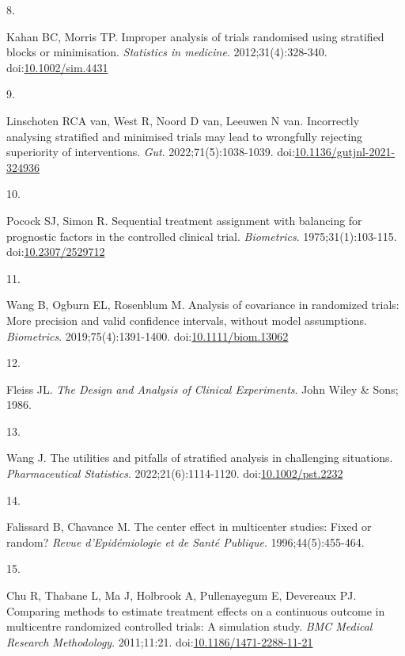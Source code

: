 \documentclass[
  11pt,
]{article}
\newlength{\cslhangindent}
\newlength{\csllabelwidth}
\newenvironment{CSLReferences}[2] %
 {\begin{list}{}{%
  \setlength{\itemindent}{0pt}
  \setlength{\leftmargin}{0pt}
  \setlength{\parsep}{0pt}
  \ifodd #1
   \setlength{\leftmargin}{\cslhangindent}
   \setlength{\itemindent}{-1\cslhangindent}
  \fi
  \setlength{\itemsep}{#2\baselineskip}}}
 {\end{list}}
\newcommand{\CSLLeftMargin}[1]{\parbox[t]{\csllabelwidth}{\strut#1\strut}}
\newcommand{\CSLRightInline}[1]{\parbox[t]{\linewidth - \csllabelwidth}{\strut#1\strut}}
\begin{document}
\begin{CSLReferences}{0}{1}
\CSLLeftMargin{8. }%
\CSLRightInline{Kahan BC, Morris TP. Improper analysis of trials randomised using stratified blocks or minimisation. \emph{Statistics in medicine}. 2012;31(4):328-340. doi:\href{https://doi.org/10.1002/sim.4431}{10.1002/sim.4431}}

\CSLLeftMargin{9. }%
\CSLRightInline{Linschoten RCA van, West R, Noord D van, Leeuwen N van. Incorrectly analysing stratified and minimised trials may lead to wrongfully rejecting superiority of interventions. \emph{Gut}. 2022;71(5):1038-1039. doi:\href{https://doi.org/10.1136/gutjnl-2021-324936}{10.1136/gutjnl-2021-324936}}

\CSLLeftMargin{10. }%
\CSLRightInline{Pocock SJ, Simon R. Sequential treatment assignment with balancing for prognostic factors in the controlled clinical trial. \emph{Biometrics}. 1975;31(1):103-115. doi:\href{https://doi.org/10.2307/2529712}{10.2307/2529712}}

\CSLLeftMargin{11. }%
\CSLRightInline{Wang B, Ogburn EL, Rosenblum M. Analysis of covariance in randomized trials: {More} precision and valid confidence intervals, without model assumptions. \emph{Biometrics}. 2019;75(4):1391-1400. doi:\href{https://doi.org/10.1111/biom.13062}{10.1111/biom.13062}}

\CSLLeftMargin{12. }%
\CSLRightInline{Fleiss JL. \emph{The Design and Analysis of Clinical Experiments}. John Wiley \& Sons; 1986.}

\CSLLeftMargin{13. }%
\CSLRightInline{Wang J. The utilities and pitfalls of stratified analysis in challenging situations. \emph{Pharmaceutical Statistics}. 2022;21(6):1114-1120. doi:\href{https://doi.org/10.1002/pst.2232}{10.1002/pst.2232}}

\CSLLeftMargin{14. }%
\CSLRightInline{Falissard B, Chavance M. The center effect in multicenter studies: Fixed or random? \emph{Revue d'Epidémiologie et de Santé Publique}. 1996;44(5):455-464.}

\CSLLeftMargin{15. }%
\CSLRightInline{Chu R, Thabane L, Ma J, Holbrook A, Pullenayegum E, Devereaux PJ. Comparing methods to estimate treatment effects on a continuous outcome in multicentre randomized controlled trials: A simulation study. \emph{BMC Medical Research Methodology}. 2011;11:21. doi:\href{https://doi.org/10.1186/1471-2288-11-21}{10.1186/1471-2288-11-21}}


\end{CSLReferences}
\end{document}
